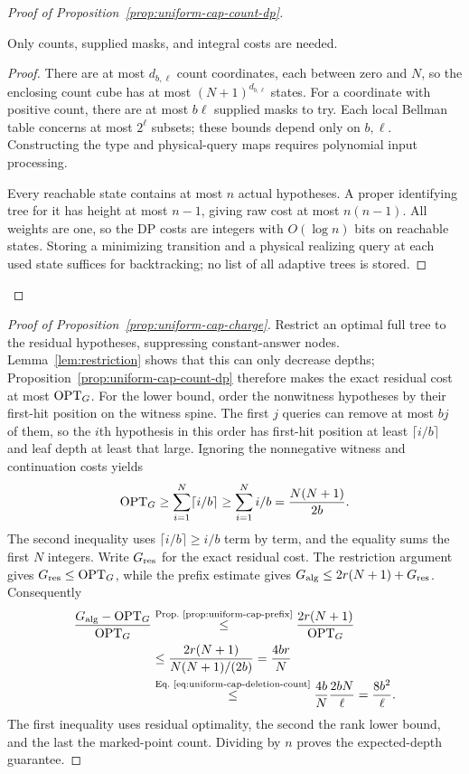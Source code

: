 \begin{proof}[Proof of Proposition~\ref{prop:uniform-cap-count-dp}]
\begin{claim}
Only counts, supplied masks, and integral costs are needed.
\end{claim}
\begin{proof}
There are at most $d_{b,\ell}$ count coordinates, each between
zero and $N$, so the enclosing count cube has at most
$(N+1)^{d_{b,\ell}}$ states. For a coordinate with positive count,
there are at most $b\ell$ supplied masks to try. Each local Bellman
table concerns at most $2^\ell$ subsets; these bounds depend only
on $b,\ell$. Constructing the type and physical-query maps requires
polynomial input processing.

Every reachable state contains at most $n$ actual hypotheses. A proper
identifying tree for it has height at most $n-1$, giving raw cost
at most $n(n-1)$. All weights are one, so the DP costs are integers
with $O(\log n)$ bits on reachable states. Storing a minimizing
transition and a physical realizing query at each used state suffices
for backtracking; no list of all adaptive trees is stored.

\end{proof}
\end{proof}

\begin{proof}[Proof of Proposition~\ref{prop:uniform-cap-charge}]
Restrict an optimal full tree to the residual hypotheses, suppressing
constant-answer nodes. Lemma~\ref{lem:restriction} shows that this
can only decrease depths; Proposition~\ref{prop:uniform-cap-count-dp}
therefore makes the exact residual cost at most
$\operatorname{OPT}_G$. For the lower bound, order the nonwitness hypotheses by their
first-hit position on the witness spine. The first $j$ queries can
remove at most $bj$ of them, so the $i$th hypothesis in this order
has first-hit position at least $\lceil i/b\rceil$ and leaf depth
at least that large. Ignoring the nonnegative witness and continuation
costs yields
\[
 \operatorname{OPT}_G\ge\sum_{i=1}^N\lceil i/b\rceil
 \ge\sum_{i=1}^N i/b=\frac{N(N+1)}{2b}.
\]
The second inequality uses $\lceil i/b\rceil\ge i/b$ term by term,
and the equality sums the first $N$ integers.
Write $G_{\rm res}$ for the exact residual cost. The restriction
argument gives $G_{\rm res}\le\operatorname{OPT}_G$, while the prefix estimate
gives $G_{\rm alg}\le2r(N+1)+G_{\rm res}$. Consequently
\begin{align*}
 \frac{G_{\rm alg}-\OPT_G}{\OPT_G}
 &\byref{Prop.}{prop:uniform-cap-prefix}{\le}\frac{2r(N+1)}{\OPT_G}\\
 &\le\frac{2r(N+1)}{N(N+1)/(2b)}
       =\frac{4br}{N}\\
 &\byref{Eq.}{eq:uniform-cap-deletion-count}{\le}\frac{4b}{N}\frac{2bN}{\ell}
       =\frac{8b^2}{\ell}.
\end{align*}
The first inequality uses residual optimality, the second the rank
lower bound, and the last the marked-point count.
Dividing by $n$ proves the expected-depth guarantee.
\end{proof}

